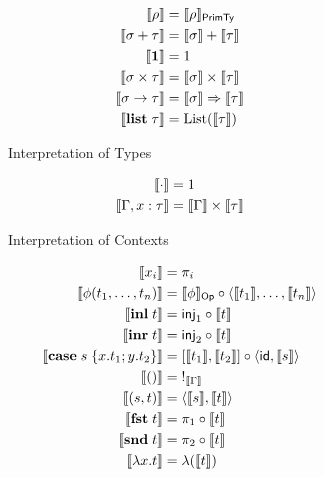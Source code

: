 \begin{figure}
  \begin{subfigure}[t]{0.47\linewidth}
    \small
    \begin{align*}
      \llbracket \rho \rrbracket &= \llbracket \rho \rrbracket_{\mathsf{PrimTy}}
      \\
      \llbracket \sigma + \tau \rrbracket &= \textstyle {\llbracket \sigma \rrbracket} + {\llbracket \tau \rrbracket}
      \\
      \llbracket \mathbf{1} \rrbracket &= 1
      \\
      \llbracket \sigma \times \tau \rrbracket &= \llbracket \sigma \rrbracket \times \llbracket \tau \rrbracket
      \\
      \llbracket \sigma \to \tau \rrbracket &= \llbracket \sigma \rrbracket \Rightarrow \llbracket \tau \rrbracket
      \\
      \llbracket \mathbf{list}\;\tau \rrbracket &= \mathrm{List}(\llbracket \tau \rrbracket)
    \end{align*}
    \caption{Interpretation of Types}
    \label{fig:semantics:types}
  \end{subfigure}
  \begin{subfigure}[t]{0.47\linewidth}
    \small
    \begin{align*}
      \llbracket \cdot \rrbracket &= 1
      \\
      \llbracket \Gamma, x: \tau \rrbracket &= \llbracket \Gamma \rrbracket \times \llbracket \tau \rrbracket
    \end{align*}
    \caption{Interpretation of Contexts}
    \label{fig:semantics:contexts}
\end{subfigure}
\begin{subfigure}{0.8\linewidth}
  \small
  \begin{align*}
  \sem{x_i} &= \pi_i
  \\
  \sem{\phi(t_1, \ldots, t_n)}
  &=
  \sem{\phi}_{\Op} \comp \prodM{\sem{t_1}}{\ldots, \sem{t_n}}
  \\
  \sem{\tmInl{t}} &= \mathsf{inj}_1 \comp \sem{t}
  \\
  \sem{\tmInr{t}} &= \mathsf{inj}_2 \comp \sem{t}
  \\
  \sem{\tmCase{s}{x}{t_1}{y}{t_2}} &= \coprodM{\sem{t_1}}{\sem{t_2}} \comp \prodM{\id}{\sem{s}}
  \\
  \sem{\tmUnit} &=\;!_{\sem{\Gamma}}
  \\
  \sem{\tmPair{s}{t}} &= \prodM{\sem{s}}{\sem{t}}
  \\
  \sem{\tmFst{t}} &= \pi_1 \comp \sem{t}
  \\
  \sem{\tmSnd{t}} &= \pi_2 \comp \sem{t}
  \\
  \sem{\tmFun{x}{t}} &= \lambda(\sem{t})

\end{align*}
\end{subfigure}
\end{figure}
